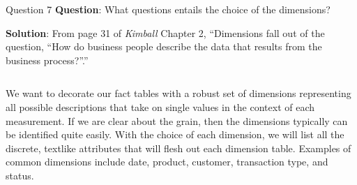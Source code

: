 \begin{frame}[fragile]{Question 7}
	\textbf{Question}: What questions entails the choice of the dimensions?\\\vspace{10pt}
	
	\textbf{Solution}: From page 31 of \textit{Kimball} Chapter 2,
	``Dimensions fall out of the question, ``How do business people describe the data that results from the business process?''.''\\\vspace{5pt}
	\begin{columns}[t,onlytextwidth]
		We want to decorate our fact tables with a robust set of dimensions representing all possible descriptions that take on single values in the context of each measurement.%
		If we are clear about the grain, then the dimensions typically can be identified quite easily. With the choice of each dimension, we will list all the discrete, textlike attributes that will flesh out each dimension table.%
		Examples of common dimensions include date, product, customer, transaction type, and status.
		 

\end{columns}
\end{frame}
